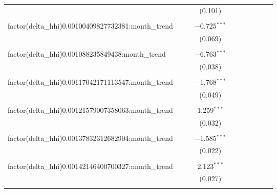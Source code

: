 \begin{table}[H]
{\begin{tabular}{@{\extracolsep{5pt}}lccccccccc}
   &  &  & (0.101) &  &  &  &  &  &  \\  

   & & & & & & & & & \\  

  factor(delta\_hhi)0.00100409827732381:month\_trend &  &  & $-$0.725$^{***}$ &  &  &  &  &  &  \\  

   &  &  & (0.069) &  &  &  &  &  &  \\  

   & & & & & & & & & \\  

  factor(delta\_hhi)0.001088235849438:month\_trend &  &  & $-$6.763$^{***}$ &  &  &  &  &  &  \\  

   &  &  & (0.038) &  &  &  &  &  &  \\  

   & & & & & & & & & \\  

  factor(delta\_hhi)0.00117042171113547:month\_trend &  &  & $-$1.768$^{***}$ &  &  &  &  &  &  \\  

   &  &  & (0.049) &  &  &  &  &  &  \\  

   & & & & & & & & & \\  

  factor(delta\_hhi)0.00121579007358063:month\_trend &  &  & 1.259$^{***}$ &  &  &  &  &  &  \\  

   &  &  & (0.032) &  &  &  &  &  &  \\  

   & & & & & & & & & \\  

  factor(delta\_hhi)0.00137832312682904:month\_trend &  &  & $-$1.585$^{***}$ &  &  &  &  &  &  \\  

   &  &  & (0.022) &  &  &  &  &  &  \\  

   & & & & & & & & & \\  

  factor(delta\_hhi)0.00142146400700327:month\_trend &  &  & 2.123$^{***}$ &  &  &  &  &  &  \\  

   &  &  & (0.027) &  &  &  &  &  &  \\  

   & & & & & & & & & \\  


\end{tabular}}
\end{table}

